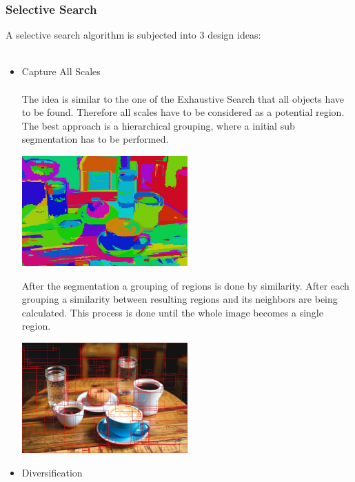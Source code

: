\subsubsection{Selective Search}
A selective search algorithm is subjected into 3 design ideas:\\ \\
\begin{itemize}
    \item Capture All Scales \\ \\
        The idea is similar to the one of the Exhaustive Search that all objects have to be found. Therefore all scales have to be
        considered as a potential region. The best approach is a hierarchical grouping, where a initial sub segmentation has to
        be performed. \cite{selectivesearch}
        \begin{center}
            \includegraphics[width=0.5\textwidth]{images/breakfast_fnh.jpg}\cite{sssegmentationc}
        \end{center}
        After the segmentation a grouping of regions is done by similarity. After each grouping a similarity between
        resulting regions and its neighbors are being calculated. This process is done until the whole image becomes a single region.\cite{selectivesearch}
        \begin{center}
            \includegraphics[width=0.5\textwidth]{images/breakfast-top-200-proposals.jpg}\cite{sssegmentationbb}
        \end{center}
    \item Diversification \\ \\

\end{itemize}
